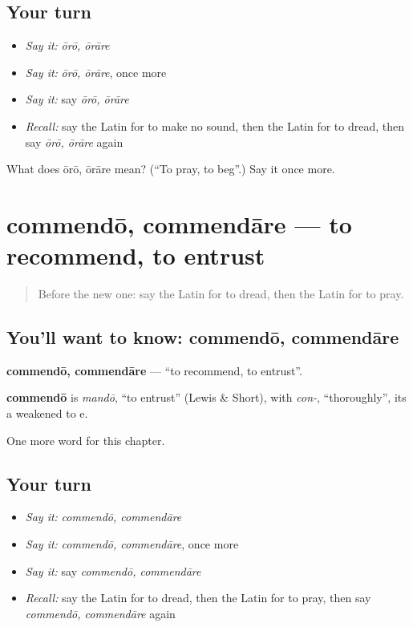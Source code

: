 \subsection*{Your turn}
\begin{itemize}
\raggedright
  \item \emph{Say it:} \emph{ōrō, ōrāre}
  \item \emph{Say it:} \emph{ōrō, ōrāre}, once more
  \item \emph{Say it:} say \emph{ōrō, ōrāre}
  \item \emph{Recall:} say the Latin for to make no sound, then the Latin for to dread, then say \emph{ōrō, ōrāre} again
\end{itemize}

\begin{tcolorbox}[breakable,colback=teal!4,colframe=teal!35!black,title={Before you move on}]
What does ōrō, ōrāre mean? (\textquotedblleft{}To pray, to beg\textquotedblright{}.) Say it once more.
\end{tcolorbox}
\section[commendō, commendāre]{commendō, commendāre — to recommend, to entrust}

\label{lesson:LA-C259-commendo}



\begin{quote}
Before the new one: say the Latin for to dread, then the Latin for to pray.
\end{quote}

\subsection*{You'll want to know: commendō, commendāre}
\textbf{commendō, commendāre} — \textquotedblleft{}to recommend, to entrust\textquotedblright{}.

\begin{cousinweb}
\textbf{commendō} is \emph{mandō}, \textquotedblleft{}to entrust\textquotedblright{} (Lewis \& Short), with \emph{con-}, \textquotedblleft{}thoroughly\textquotedblright{}, its a weakened to e.
\end{cousinweb}

\begin{grammarlens}[title={What you've built}]
One more word for this chapter.
\end{grammarlens}

\subsection*{Your turn}
\begin{itemize}
\raggedright
  \item \emph{Say it:} \emph{commendō, commendāre}
  \item \emph{Say it:} \emph{commendō, commendāre}, once more
  \item \emph{Say it:} say \emph{commendō, commendāre}
  \item \emph{Recall:} say the Latin for to dread, then the Latin for to pray, then say \emph{commendō, commendāre} again
\end{itemize}

